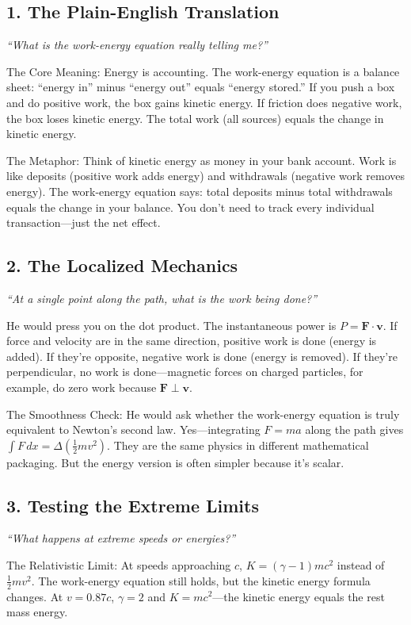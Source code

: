 \documentclass[11pt,openright]{book}
\begin{document}
\subsection*{1. The Plain-English Translation}
\textit{``What is the work-energy equation really telling me?''}

The Core Meaning: Energy is accounting. The work-energy equation is a balance sheet: ``energy in'' minus ``energy out'' equals ``energy stored.'' If you push a box and do positive work, the box gains kinetic energy. If friction does negative work, the box loses kinetic energy. The total work (all sources) equals the change in kinetic energy.

The Metaphor: Think of kinetic energy as money in your bank account. Work is like deposits (positive work adds energy) and withdrawals (negative work removes energy). The work-energy equation says: total deposits minus total withdrawals equals the change in your balance. You don't need to track every individual transaction---just the net effect.

\subsection*{2. The Localized Mechanics}
\textit{``At a single point along the path, what is the work being done?''}

He would press you on the dot product. The instantaneous power is $P = \mathbf{F} \cdot \mathbf{v}$. If force and velocity are in the same direction, positive work is done (energy is added). If they're opposite, negative work is done (energy is removed). If they're perpendicular, no work is done---magnetic forces on charged particles, for example, do zero work because $\mathbf{F} \perp \mathbf{v}$.

The Smoothness Check: He would ask whether the work-energy equation is truly equivalent to Newton's second law. Yes---integrating $F = ma$ along the path gives $\int F \, dx = \Delta(\frac{1}{2}mv^2)$. They are the same physics in different mathematical packaging. But the energy version is often simpler because it's scalar.

\subsection*{3. Testing the Extreme Limits}
\textit{``What happens at extreme speeds or energies?''}

The Relativistic Limit: At speeds approaching $c$, $K = (\gamma - 1)mc^2$ instead of $\frac{1}{2}mv^2$. The work-energy equation still holds, but the kinetic energy formula changes. At $v = 0.87c$, $\gamma = 2$ and $K = mc^2$---the kinetic energy equals the rest mass energy.
\end{document}
